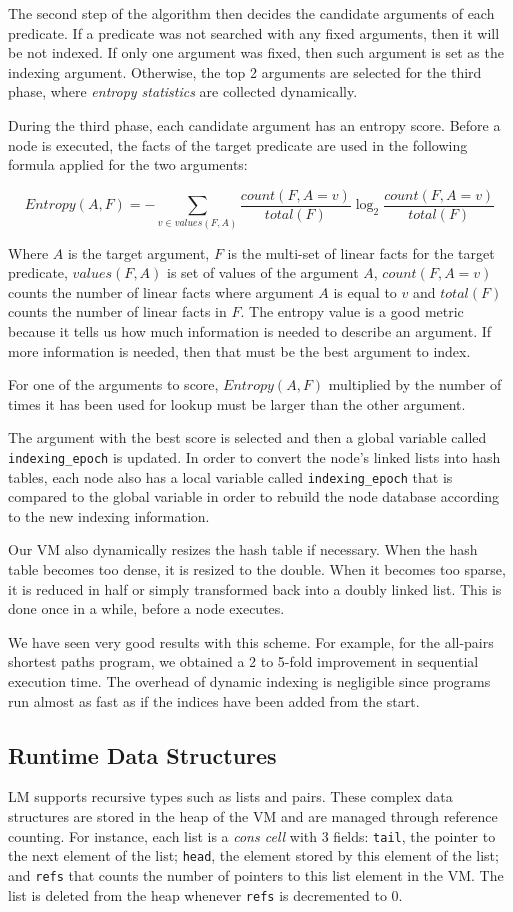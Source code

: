 The second step of the algorithm then decides the candidate arguments of each predicate.
If a predicate was not searched with any fixed arguments, then it will be not indexed.
If only one argument was fixed, then such argument is set as the indexing argument. Otherwise, the top 2 arguments
are selected for the third phase, where \emph{entropy statistics} are collected dynamically.

During the third phase, each candidate argument has an entropy score.
Before a node is executed, the facts of the target predicate
are used in the following formula applied for the two arguments:

{\scriptsize
\[
Entropy(A, F) = - \sum_{v \in values(F, A)} \frac{count(F, A = v)}{total(F)} 	\log_2 \frac{count(F, A = v)}{total(F)}
\]
}

Where $A$ is the target argument, $F$ is the multi-set of linear facts for the target predicate, $values(F, A)$ is set of values of the argument $A$, $count(F, A = v)$ counts the number
of linear facts where argument $A$ is equal to $v$ and $total(F)$ counts the number of linear facts in $F$.
The entropy value is a good metric because it tells us how much information is needed to describe an argument.
If more information is needed, then that must be the best argument to index.

For one of the arguments to score, $Entropy(A, F)$ multiplied by the number of times it has been used for lookup must be larger than the other argument.

The argument with the best score is selected and then
a global variable called \texttt{indexing\_epoch} is updated.
In order to convert the node's linked lists into hash tables, each node also has a local variable called \texttt{indexing\_epoch}
that is compared to the global variable in order to rebuild the node database according to the new indexing
information.

Our VM also dynamically resizes the hash table if necessary. When the hash table becomes
too dense, it is resized to the double. When it becomes too sparse, it is reduced in half
or simply transformed back into a doubly linked list. This is done once in a while, before a node executes.

We have seen very good results with this scheme. For example, for the all-pairs shortest paths program,
we obtained a 2 to 5-fold improvement in sequential execution time.
The overhead of dynamic indexing is negligible since programs run almost as fast
as if the indices have been added from the start.

\subsection{Runtime Data Structures}

LM supports recursive types such as lists and pairs. These complex data structures are stored in
the heap of the VM and are managed through reference counting. For instance, each list
is a \emph{cons cell} with 3 fields: \texttt{tail}, the pointer to the next element of the list;
\texttt{head}, the element stored by this element of the list; and \texttt{refs} that counts the
number of pointers to this list element in the VM. The list is deleted from the heap whenever
\texttt{refs} is decremented to 0.
